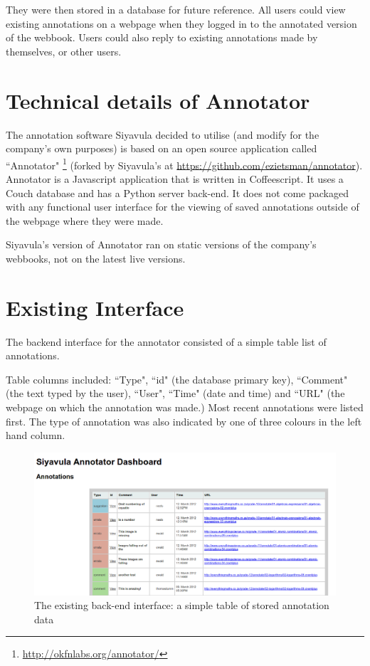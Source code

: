 They were then stored in a database for future reference. All users could view existing annotations on a webpage when they logged in to the annotated version of the webbook. Users could also reply to existing annotations made by themselves, or other users.

\section{Technical details of Annotator}
The annotation software Siyavula decided to utilise (and modify for the company's own purposes) is based on an open source application called ``Annotator" \footnote{\href{ http://okfnlabs.org/annotator/}{ http://okfnlabs.org/annotator/}} (forked by Siyavula’s at \href{https://github.com/ezietsman/annotator}{https://github.com/ezietsman/annotator}). Annotator is a Javascript application that is written in Coffeescript. It uses a Couch database and has a Python server back-end. It does not come packaged with any functional user interface for the viewing of saved annotations outside of the webpage where they were made.

Siyavula’s version of Annotator ran on static versions of the company’s webbooks, not on the latest live versions.

\section{Existing Interface}
The backend interface for the annotator consisted of a simple table list of annotations.

Table columns included: ``Type", ``id" (the database primary key), ``Comment" (the text typed by the user), ``User", ``Time" (date and time) and ``URL" (the webpage on which the annotation was made.) Most recent annotations were listed first. The type of annotation was also indicated by one of three colours in the left hand column.
\begin{figure}[h]
    \centering
    \includegraphics[width=\textwidth]{Figures/annotator-backend-table.png}
 \caption{The existing back-end interface: a simple table of stored annotation data}
\end{figure}


